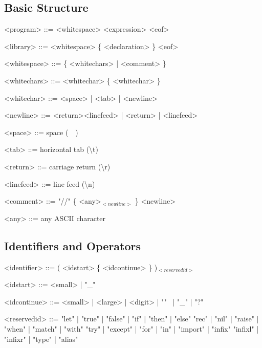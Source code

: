\documentclass{article}
\begin{document}
\subsection{Basic Structure}

\begin{grammar}
  <program> ::= <whitespace> <expression> <eof>

  <library> ::= <whitespace> \{ <declaration> \} <eof>
\end{grammar}

\begin{grammar}
  <whitespace> ::= \{ <whitechars> | <comment> \}

  <whitechars> ::= <whitechar> \{ <whitechar> \}

  <whitechar> ::= <space> | <tab> | <newline>

  <newline> ::= <return><linefeed> | <return> | <linefeed>

  <space> ::= space (\textquotesingle \ \ \textquotesingle)

  <tab> ::= horizontal tab (\textquotesingle \textbackslash t\textquotesingle)

  <return> ::= carriage return (\textquotesingle \textbackslash r\textquotesingle)

  <linefeed> ::= line feed (\textquotesingle \textbackslash n\textquotesingle)
\end{grammar}

\begin{grammar}
  <comment> ::= "//" \{ <any>$_{<newline>}$ \} <newline>

  <any> ::= any ASCII character
\end{grammar}

\subsection{Identifiers and Operators}

\begin{grammar}
  <identifier> ::= ( <idstart> \{ <idcontinue> \} )$_{<reservedid>}$

  <idstart> ::= <small> | "_"

  <idcontinue> ::= <small> | <large> | <digit> | "\textquotesingle" \ | "_" | "?"
\end{grammar}

\begin{grammar}
  <reservedid> ::= "let" | "true" | "false" | "if" | "then" | "else"
  \alt "rec" | "nil" | "raise" | "when" | "match" | "with"
  \alt "try" | "except" | "for" | "in" | "import" | "infix"
  \alt "infixl" | "infixr" | "type" | "alias"
\end{grammar}
\end{document}
